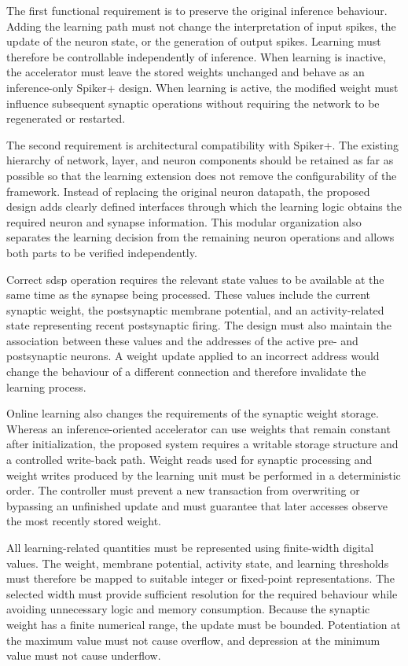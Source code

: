 The first functional requirement is to preserve the original inference behaviour. Adding the learning path must not change the interpretation of input spikes, the update of the neuron state, or the generation of output spikes. Learning must therefore be controllable independently of inference. When learning is inactive, the accelerator must leave the stored weights unchanged and behave as an inference-only Spiker+ design. When learning is active, the modified weight must influence subsequent synaptic operations without requiring the network to be regenerated or restarted.

The second requirement is architectural compatibility with Spiker+. The existing hierarchy of network, layer, and neuron components should be retained as far as possible so that the learning extension does not remove the configurability of the framework. Instead of replacing the original neuron datapath, the proposed design adds clearly defined interfaces through which the learning logic obtains the required neuron and synapse information. This modular organization also separates the learning decision from the remaining neuron operations and allows both parts to be verified independently.

Correct \gls{sdsp} operation requires the relevant state values to be available at the same time as the synapse being processed. These values include the current synaptic weight, the postsynaptic membrane potential, and an activity-related state representing recent postsynaptic firing. The design must also maintain the association between these values and the addresses of the active pre- and postsynaptic neurons. A weight update applied to an incorrect address would change the behaviour of a different connection and therefore invalidate the learning process.

Online learning also changes the requirements of the synaptic weight storage. Whereas an inference-oriented accelerator can use weights that remain constant after initialization, the proposed system requires a writable storage structure and a controlled write-back path. Weight reads used for synaptic processing and weight writes produced by the learning unit must be performed in a deterministic order. The controller must prevent a new transaction from overwriting or bypassing an unfinished update and must guarantee that later accesses observe the most recently stored weight.

All learning-related quantities must be represented using finite-width digital values. The weight, membrane potential, activity state, and learning thresholds must therefore be mapped to suitable integer or fixed-point representations. The selected width must provide sufficient resolution for the required behaviour while avoiding unnecessary logic and memory consumption. Because the synaptic weight has a finite numerical range, the update must be bounded. Potentiation at the maximum value must not cause overflow, and depression at the minimum value must not cause underflow.

